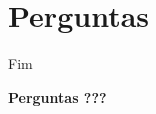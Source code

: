 \section{Perguntas}

\begin{frame}{Fim}
	\begin{block}{ }
		\begin{center}
			\textbf{Perguntas ???}
		\end{center}
	\end{block}
\end{frame}